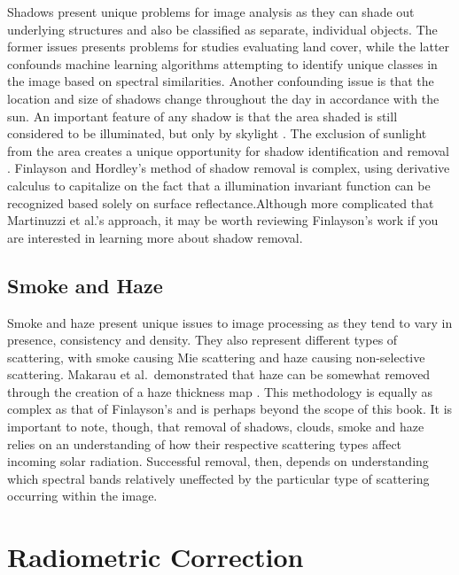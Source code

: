 \documentclass[
]{book}
\begin{document}
Shadows present unique problems for image analysis as they can shade out underlying structures and also be classified as separate, individual objects. The former issues presents problems for studies evaluating land cover, while the latter confounds machine learning algorithms attempting to identify unique classes in the image based on spectral similarities. Another confounding issue is that the location and size of shadows change throughout the day in accordance with the sun.
An important feature of any shadow is that the area shaded is still considered to be illuminated, but only by skylight . The exclusion of sunlight from the area creates a unique opportunity for shadow identification and removal \citep{finlayson_color_2001}. Finlayson and Hordley's method of shadow removal is complex, using derivative calculus to capitalize on the fact that a illumination invariant function can be recognized based solely on surface reflectance.Although more complicated that Martinuzzi et al.'s approach, it may be worth reviewing Finlayson's work if you are interested in learning more about shadow removal.

\hypertarget{smoke-and-haze}{%
\subsection{Smoke and Haze}\label{smoke-and-haze}}

Smoke and haze present unique issues to image processing as they tend to vary in presence, consistency and density. They also represent different types of scattering, with smoke causing Mie scattering and haze causing non-selective scattering. Makarau et al.~demonstrated that haze can be somewhat removed through the creation of a haze thickness map \citep{makarau_haze_2014}. This methodology is equally as complex as that of Finlayson's and is perhaps beyond the scope of this book. It is important to note, though, that removal of shadows, clouds, smoke and haze relies on an understanding of how their respective scattering types affect incoming solar radiation. Successful removal, then, depends on understanding which spectral bands relatively uneffected by the particular type of scattering occurring within the image.

\hypertarget{radiometric-correction}{%
\section{Radiometric Correction}\label{radiometric-correction}}
\end{document}

